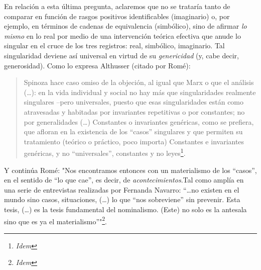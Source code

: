 \documentclass{book}
\begin{document}
En relación a esta última pregunta, aclaremos que no se trataría tanto
de comparar en función de rasgos positivos identificables (imaginario)
o, por ejemplo, en términos de cadenas de equivalencia (simbólico), sino
de afirmar \emph{lo mismo} en lo real por medio de una intervención
teórica efectiva que anude lo singular en el cruce de los tres
registros: real, simbólico, imaginario. Tal singularidad deviene así
universal en virtud de su \emph{genericidad} (y, cabe decir,
generosidad). Como lo expresa Althusser (citado por Romé):

\begin{quote}
Spinoza hace caso omiso de la objeción, al igual que Marx o que el
análisis (\ldots): en la vida individual y social no hay más que
singularidades realmente singulares --pero universales, puesto que esas
singularidades están como atravesadas y habitadas por invariantes
repetitivas o por constantes; no por generalidades (\ldots) Constantes o
invariantes genéricas, como se prefiera, que afloran en la existencia de
los ``casos'' singulares y que permiten su tratamiento (teórico o
práctico, poco importa) Constantes e invariantes genéricas, y no
``universales'', constantes y no leyes\footnote{\emph{Idem}}.
\end{quote}

Y continúa Romé: "Nos encontramos entonces con un materialismo de los
``casos'', en el sentido de ``lo que cae'', es decir, de
\emph{acontecimientos}.Tal como amplía en una serie de entrevistas
realizadas por Fernanda Navarro: ``\ldots no existen en el mundo sino
casos, situaciones, (\ldots) lo que ``nos sobreviene'' sin prevenir.
Esta tesis, (\ldots) es la tesis fundamental del nominalismo. (Este) no
solo es la antesala sino que es ya el materialismo''"\footnote{\emph{Idem}}.
\end{document}
